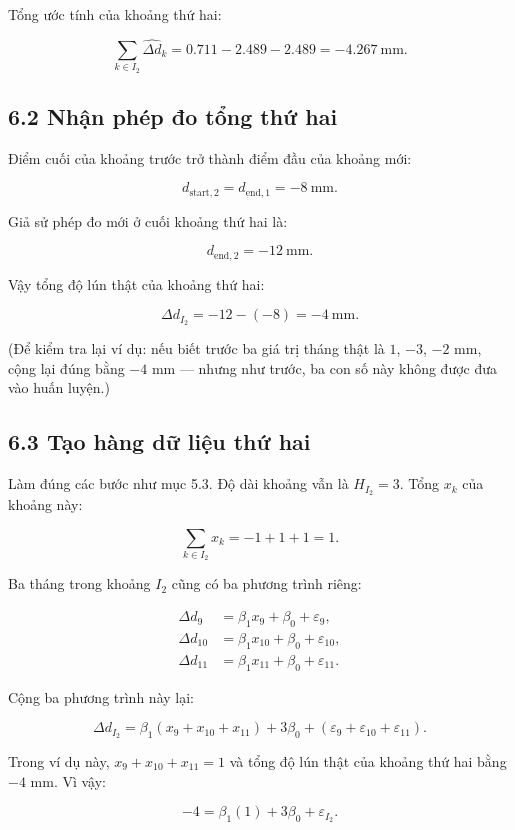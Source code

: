 \documentclass[12pt]{article}
\begin{document}
Tổng ước tính của khoảng thứ hai:

\[
\sum_{k\in I_2}\widehat{\Delta d}_k
=
0.711-2.489-2.489
=
-4.267\ \mathrm{mm}.
\]

\subsection{6.2 Nhận phép đo tổng thứ hai}

Điểm cuối của khoảng trước trở thành điểm đầu của khoảng mới:

\[
d_{\mathrm{start},2}
=
d_{\mathrm{end},1}
=
-8\ \mathrm{mm}.
\]

Giả sử phép đo mới ở cuối khoảng thứ hai là:

\[
d_{\mathrm{end},2}=-12\ \mathrm{mm}.
\]

Vậy tổng độ lún thật của khoảng thứ hai:

\[
\Delta d_{I_2}
=
-12-(-8)
=
-4\ \mathrm{mm}.
\]

(Để kiểm tra lại ví dụ: nếu biết trước ba giá trị tháng thật là $1$, $-3$, $-2$ mm, cộng lại đúng bằng $-4$ mm — nhưng như trước, ba con số này không được đưa vào huấn luyện.)

\subsection{6.3 Tạo hàng dữ liệu thứ hai}

Làm đúng các bước như mục 5.3. Độ dài khoảng vẫn là $H_{I_2}=3$. Tổng $x_k$ của khoảng này:

\[
\sum_{k\in I_2}x_k
=
-1+1+1
=
1.
\]

Ba tháng trong khoảng $I_2$ cũng có ba phương trình riêng:

\[
\begin{aligned}
\Delta d_{9} &= \beta_1 x_9+\beta_0+\varepsilon_9,\\
\Delta d_{10} &= \beta_1 x_{10}+\beta_0+\varepsilon_{10},\\
\Delta d_{11} &= \beta_1 x_{11}+\beta_0+\varepsilon_{11}.
\end{aligned}
\]

Cộng ba phương trình này lại:

\[
\Delta d_{I_2}
=
\beta_1(x_9+x_{10}+x_{11})
+
3\beta_0
+
(\varepsilon_9+\varepsilon_{10}+\varepsilon_{11}).
\]

Trong ví dụ này, $x_9+x_{10}+x_{11}=1$ và tổng độ lún thật của khoảng thứ hai bằng $-4$ mm. Vì vậy:

\[
-4
=
\beta_1(1)
+
3\beta_0
+
\varepsilon_{I_2}.
\]
\end{document}
